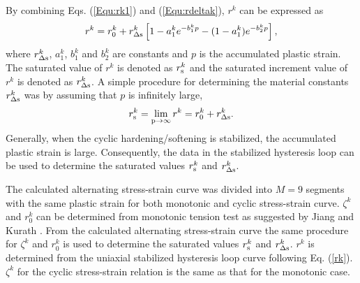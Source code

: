 \documentclass[preprint,5p,twocolumn,11pt,sort&compress]{elsarticle}
\begin{document}
By combining Eqs. (\ref{Equ:rk1}) and (\ref{Equ:rdeltak}), $r^k$ can be expressed as
\begin{equation}
\label{rk}
{r^k} = r_0^k + r_{\Delta \rm s}^k\left[ {1 - a_1^k{e^{ - b_1^kp}} - (1-a_1^k){e^{ - b_2^kp}} }\right],
\end{equation}
where $r_{\Delta \rm s}^k$, $a_1^k$, $b_1^k$ and $b_2^k$ are constants and $p$ is the accumulated plastic strain.
The saturated value of $r^k$ is denoted as $r^k_{\rm s}$ and the saturated increment value of $r^k$ is denoted as $r^k_{\Delta \rm s}$.
A simple procedure for determining the material constants $r_{\Delta \rm s}^k$ was by assuming that $p$ is infinitely large,
\begin{equation}
r_{\rm s}^k=\mathop {\lim }\limits_{{\rm{p}} \to \infty } {r^k} = r_0^k + r_{\Delta \rm s}^k.
\label{Equ:rsk}
\end{equation}
Generally, when the cyclic hardening/softening is stabilized, the accumulated plastic strain is large.
Consequently, the data in the stabilized hysteresis loop can be used to determine the saturated values $r^k_{\rm s}$ and $r^k_{\Delta \rm s}$.

The calculated alternating stress-strain curve was divided into $M=9$ segments with the same plastic strain for both monotonic and cyclic stress-strain curve.  $\zeta^k$ and $r_0^k$ can be determined from monotonic tension test as suggested by Jiang and Kurath \cite{Jiang1996387}. From the calculated alternating stress-strain curve the same procedure for $\zeta^k$ and $r_0^k$ is used to determine the saturated values $r^k_{\rm s}$ and $r^k_{\Delta \rm s}$.  $r^k$ is determined from the uniaxial stabilized hysteresis loop curve following Eq. (\ref{rk}). ${\zeta ^k}$ for the cyclic stress-strain relation is the same as that for the monotonic case.

\end{document}
